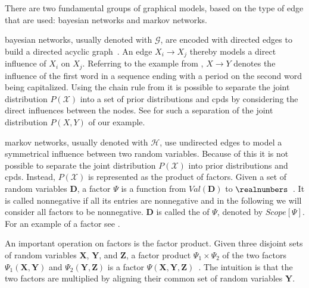 There are two fundamental groups of graphical models, based on the type of edge that are used: \glspl{bayesian network} and \glspl{markov network}.

\bigskip

\Glspl{bayesian network}, usually denoted with $\mathcal{G}$, are encoded with directed \glspl{edge} to build a directed acyclic graph~\citep{koller2009probabilistic}.
An \gls{edge} $X_i\to X_j$ thereby models a direct influence of $X_i$ on $X_j$.
Referring to the example from , $X\to Y$ denotes the influence of the first word in a sequence ending with a period on the second word being capitalized.
Using the chain rule from  it is possible to separate the \gls{joint distribution} $P(\mathcal{X})$ into a set of \glspl{prior distribution} and \glspl{cpd} by considering the direct influences between the \glspl{node}.
See  for such a separation of the \gls{joint distribution} $P(X,Y)$ of our example.

\bigskip

\Glspl{markov network}, usually denoted with $\mathcal{H}$, use undirected \glspl{edge} to model a symmetrical influence between two \glspl{random variable}.
Because of this it is not possible to separate the \gls{joint distribution} $P(\mathcal{X})$ into \glspl{prior distribution} and \glspl{cpd}.
Instead, $P(\mathcal{X})$ is represented as the product of \glspl{factor}.
Given a set of \glspl{random variable} $\bm{D}$, a \gls{factor} $\Psi$ is a function from $Val(\bm{D})$ to $\realnumbers$~\citep{koller2009probabilistic}.
It is called nonnegative if all its entries are nonnegative and in the following we will consider all factors to be nonnegative.
$\bm{D}$ is called the  of $\Psi$, denoted by $Scope[\Psi]$.
For an example of a factor see .

An important operation on factors is the \gls{factor product}.
Given three disjoint sets of random variables $\bm{X}$, $\bm{Y}$, and $\bm{Z}$, a \gls{factor product} $\Psi_1\times \Psi_2$ of the two factors $\Psi_1(\bm{X},\bm{Y})$ and $\Psi_2(\bm{Y},\bm{Z})$ is a factor $\Psi(\bm{X},\bm{Y},\bm{Z})$~\citep{koller2009probabilistic}.
The intuition is that the two factors are multiplied by aligning their common set of \glspl{random variable} $\bm{Y}$.


